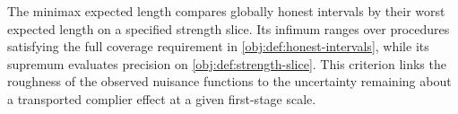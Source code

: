 The minimax expected length  compares globally honest intervals by their worst expected length on a specified strength slice. Its infimum ranges over procedures satisfying the full coverage requirement in \cref{obj:def:honest-intervals}, while its supremum evaluates precision on \cref{obj:def:strength-slice}. This criterion links the roughness of the observed nuisance functions to the uncertainty remaining about a transported complier effect at a given first-stage scale.
